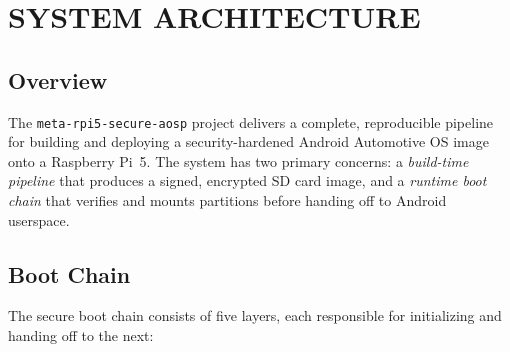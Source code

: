 \chapter{SYSTEM ARCHITECTURE}
\label{ch:architecture}

\section{Overview}

The \texttt{meta-rpi5-secure-aosp} project delivers a complete, reproducible pipeline for building and deploying a security-hardened Android Automotive OS image onto a Raspberry Pi~5. The system has two primary concerns: a \textit{build-time pipeline} that produces a signed, encrypted SD card image, and a \textit{runtime boot chain} that verifies and mounts partitions before handing off to Android userspace.

\section{Boot Chain}
\label{sec:arch_bootchain}

The secure boot chain consists of five layers, each responsible for initializing and handing off to the next:

